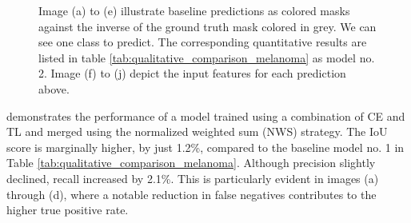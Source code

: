 \begin{figure}[H]
  \caption[Quantitative loss merging analysis for the \ac{SLD}]{Image (a) to (e) illustrate baseline predictions as colored masks against the inverse of the ground truth mask colored in grey. We can see one class to predict. The corresponding quantitative results are listed in table \ref{tab:qualitative_comparison_melanoma} as model no. 2. Image (f) to (j) depict the input features for each prediction above.}
  \label{cetl_melanoma_lossCombo}
\end{figure}
 demonstrates the performance of a model trained using a combination of \ac{CE} and \ac{TL} and merged using the normalized weighted sum (NWS) strategy. The \ac{IoU} score is marginally higher, by just 1.2\%, compared to the baseline model no. 1 in Table \ref{tab:qualitative_comparison_melanoma}. Although precision slightly declined, recall increased by 2.1\%. This is particularly evident in images (a) through (d), where a notable reduction in false negatives contributes to the higher true positive rate.
